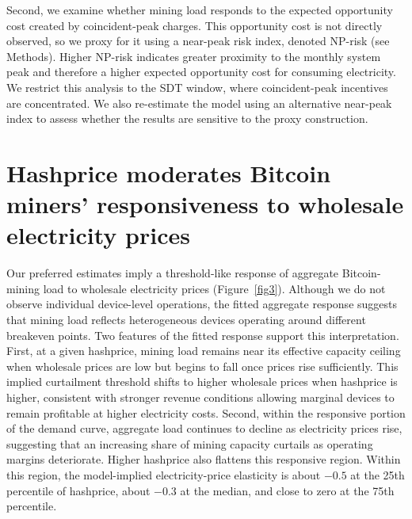 \documentclass[pdflatex,sn-mathphys-num]{sn-jnl}%
\theoremstyle{thmstyleone}%
\theoremstyle{thmstyletwo}%
\theoremstyle{thmstylethree}%
\begin{document}
Second, we examine whether mining load responds to the expected opportunity cost created by coincident-peak charges. This opportunity cost is not directly observed, so we proxy for it using a near-peak risk index, denoted NP-risk (see Methods). Higher NP-risk indicates greater proximity to the monthly system peak and therefore a higher expected opportunity cost for consuming electricity. We restrict this analysis to the SDT window, where coincident-peak incentives are concentrated. We also re-estimate the model using an alternative near-peak index to assess whether the results are sensitive to the proxy construction.

\section{Hashprice moderates Bitcoin miners' responsiveness to wholesale electricity prices}\label{sec2}

Our preferred estimates imply a threshold-like response of aggregate Bitcoin-mining load to wholesale electricity prices (Figure~\ref{fig3}). Although we do not observe individual device-level operations, the fitted aggregate response suggests that mining load reflects heterogeneous devices operating around different breakeven points. Two features of the fitted response support this interpretation. First, at a given hashprice, mining load remains near its effective capacity ceiling when wholesale prices are low but begins to fall once prices rise sufficiently. This implied curtailment threshold shifts to higher wholesale prices when hashprice is higher, consistent with stronger revenue conditions allowing marginal devices to remain profitable at higher electricity costs. Second, within the responsive portion of the demand curve, aggregate load continues to decline as electricity prices rise, suggesting that an increasing share of mining capacity curtails as operating margins deteriorate. Higher hashprice also flattens this responsive region. Within this region, the model-implied electricity-price elasticity is about $-0.5$ at the 25th percentile of hashprice, about $-0.3$ at the median, and close to zero at the 75th percentile.
\end{document}
